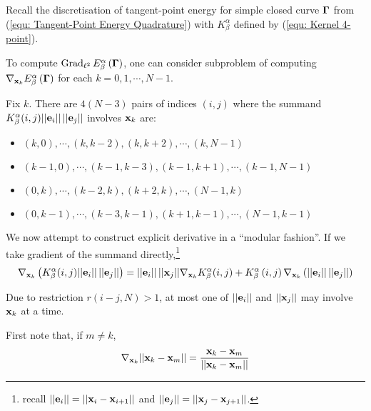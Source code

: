 \documentclass[../dissertation.tex]{subfiles}
\begin{document}
Recall the discretisation of tangent-point energy for simple closed curve $\boldsymbol{\Gamma}$ from (\ref{equ: Tangent-Point Energy Quadrature})
with $K_{\beta}^{\alpha}$ defined by (\ref{equ: Kernel 4-point}).

To compute $\operatorname{Grad}_{\ell^2} E_{\beta}^{\alpha} \left( \boldsymbol{\Gamma} \right)$,
one can consider subproblem of computing $\nabla_{\mathbf{x}_k} E_{\beta}^{\alpha} \left( \boldsymbol{\Gamma} \right)$
for each $k=0, 1, \cdots, N-1$.

Fix $k$.
There are $4\left( N-3 \right)$ pairs of indices $(i,j)$ where the summand $K_{\beta}^{\alpha} (i,j) \lvert \lvert \mathbf{e}_i \rvert \rvert\,\lvert \lvert \mathbf{e}_j \rvert \rvert$ involves $\mathbf{x}_k$ are:
\begin{itemize}
    \item $(k,0), \cdots, (k,k-2), (k,k+2), \cdots, (k,N-1)$
    \item $(k-1,0), \cdots, (k-1,k-3), (k-1,k+1), \cdots, (k-1,N-1)$
    \item $(0, k), \cdots, (k-2,k), (k+2,k), \cdots, (N-1,k)$
    \item $(0,k-1), \cdots, (k-3,k-1), (k+1,k-1), \cdots, (N-1, k-1)$
\end{itemize}

We now attempt to construct explicit derivative in a ``modular fashion''.
If we take gradient of the summand directly,\footnote{recall $\lvert \lvert \mathbf{e}_i \rvert \rvert = \lvert \lvert \mathbf{x}_i - \mathbf{x}_{i+1} \rvert \rvert$ and $\lvert \lvert \mathbf{e}_j \rvert \rvert = \lvert \lvert \mathbf{x}_j - \mathbf{x}_{j+1} \rvert \rvert$.}
\begin{equation}
    \nabla_{\mathbf{x}_k} \left( K_{\beta}^{\alpha} (i,j) \lvert \lvert \mathbf{e}_i \rvert \rvert\,\lvert \lvert \mathbf{e}_j \rvert \rvert \right) = \lvert \lvert \mathbf{e}_i \rvert \rvert\,\lvert \lvert \mathbf{x}_j \rvert \rvert \nabla_{\mathbf{x}_k} K_{\beta}^{\alpha} (i,j) + K_{\beta}^{\alpha} \left( i,j \right) \nabla_{\mathbf{x}_k} \left( \lvert \lvert \mathbf{e}_i \rvert \rvert \, \lvert \lvert \mathbf{e}_j \rvert \rvert \right)
    \label{equ: Exact Gradient 1}
\end{equation}

Due to restriction $r\left( i-j,N \right) > 1$, at most one of $\lvert \lvert \mathbf{e}_i \rvert \rvert$ and $\lvert \lvert \mathbf{x}_j \rvert \rvert$ may involve $\mathbf{x}_k$ at a time.

First note that, if $m \neq k$,
\begin{equation}
    \nabla_{\mathbf{x}_k} \lvert \lvert \mathbf{x}_k - \mathbf{x}_m \rvert \rvert = \frac{\mathbf{x}_k - \mathbf{x}_m}{\lvert \lvert \mathbf{x}_k - \mathbf{x}_m \rvert \rvert}
    \label{equ: Exact Gradient 2}
\end{equation}
\end{document}
